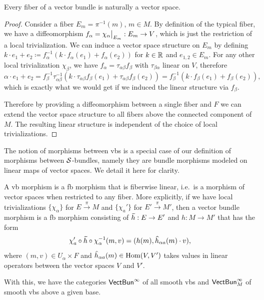 \begin{prop}
    Every fiber of a vector bundle is naturally a vector space.
\end{prop}
\begin{proof}
    Consider a fiber $E_m=\pi^{-1}(m)$, $m\in M$. By definition of the typical fiber, we have a diffeomorphism $f_\alpha=\restr{\chi_\alpha}{E_m}:E_m\to V$, which is just the restriction of a local trivialization. We can induce a vector space structure on $E_m$ by defining $k\cdot e_1+e_2\coloneqq f_\alpha^{-1}(k\cdot f_\alpha(e_1)+f_\alpha(e_2))$ for $k\in \mathbb{R} $ and $e_{1,2}\in E_m$. For any other local trivialization $\chi_\beta$, we have $f_\alpha=\tau_{\alpha\beta}f_\beta$ with $\tau_{\beta\alpha}$ linear on $V$, therefore 
    \[
    \alpha\cdot e_1+e_2=f_\beta^{-1}\tau_{\alpha\beta}^{-1}(k\cdot \tau_{\alpha\beta}f_\beta(e_1)+\tau_{\alpha\beta}f_\beta(e_2))=f_\beta^{-1}(k\cdot f_\beta(e_1)+f_\beta(e_2)),
    \] 
    which is exactly what we would get if we induced the linear structure via $f_\beta$.
    
    Therefore by providing a diffeomorphism between a single fiber and $F$ we can extend the vector space structure to all fibers above the connected component of $M$. The resulting linear structure is independent of the choice of local trivializations.
\end{proof}

The notion of morphisms between \glspl{vb} is a special case of our definition of morphisms between $\mathcal{S}$-bundles, namely they are bundle morphisms modeled on linear maps of vector spaces. We detail it here for clarity.

\begin{defn}
    A \gls{vb} morphism is a \gls{fb} morphism that is fiberwise linear, i.e.\ is a morphism of vector spaces when restricted to any fiber. More explicitly, if we have  local trivializations $\{\chi_\alpha\}$ for $E\overset{\pi}{\to}M$ and $\{\chi_a'\}$ for $E'\overset{\pi}{\to}M'$, then a vector bundle morphism is a \gls{fb} morphism consisting of $\wt{h}:E\to E'$ and $h:M\to M'$ that has the form 
    \[\chi_a '\circ \wt{h} \circ \chi_\alpha^{-1}(m,v)=(h(m),\wh{h}_{\alpha a}(m)\cdot v),\]
    where $(m,v)\in U_\alpha\times F$ and $\wh{h}_{\alpha a}(m)\in \Hom(V,V')$ takes values in linear operators between the vector spaces $V$ and $V'$.

    With this, we have the categories $\mathsf{VectBun}^\infty $ of all smooth \glspl{vb} and $\mathsf{VectBun}^\infty_M$ of smooth \glspl{vb} above a given base.
\end{defn}


